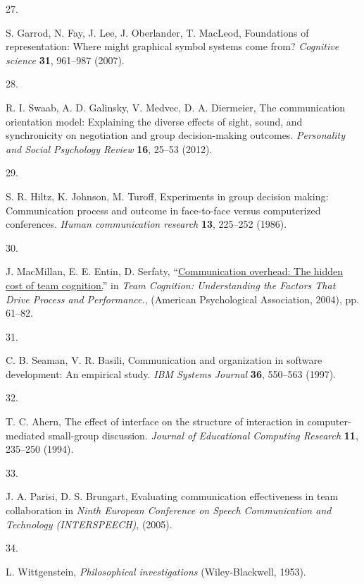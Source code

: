 \documentclass[9pt,twocolumn,twoside]{pnas-new}
\makeatletter
\newlength{\cslhangindent}
\newlength{\csllabelwidth}
\newenvironment{CSLReferences}[2] %
 {\begin{list}{}{%
  \setlength{\itemindent}{0pt}
  \setlength{\leftmargin}{0pt}
  \setlength{\parsep}{0pt}
   \normalfont\sffamily\fontsize{6}{8}\selectfont
    \labelsep2.8pt
   \renewcommand\newblock{\hskip .11em \@plus.33em \@minus.07em}
  \ifodd #1
   \setlength{\leftmargin}{\cslhangindent}
   \setlength{\itemindent}{-1\cslhangindent}
  \fi
  \setlength{\itemsep}{0.0pt}}}
 {\end{list}}
\newcommand{\CSLLeftMargin}[1]{\parbox[t]{\csllabelwidth}{#1}}
\newcommand{\CSLRightInline}[1]{\parbox[t]{\linewidth - \csllabelwidth}{#1}\break}
\makeatother
\begin{document}
\begin{CSLReferences}{0}{1}
	\CSLLeftMargin{27. }%
	\CSLRightInline{S. Garrod, N. Fay, J. Lee, J. Oberlander, T. MacLeod,
		Foundations of representation: Where might graphical symbol systems come
		from? \emph{Cognitive science} \textbf{31}, 961--987 (2007).}
	
	\CSLLeftMargin{28. }%
	\CSLRightInline{R. I. Swaab, A. D. Galinsky, V. Medvec, D. A. Diermeier,
		The communication orientation model: Explaining the diverse effects of
		sight, sound, and synchronicity on negotiation and group decision-making
		outcomes. \emph{Personality and Social Psychology Review} \textbf{16},
		25--53 (2012).}
	
	\CSLLeftMargin{29. }%
	\CSLRightInline{S. R. Hiltz, K. Johnson, M. Turoff, Experiments in group
		decision making: Communication process and outcome in face-to-face
		versus computerized conferences. \emph{Human communication research}
		\textbf{13}, 225--252 (1986).}
	
	\CSLLeftMargin{30. }%
	\CSLRightInline{J. MacMillan, E. E. Entin, D. Serfaty,
		{``\href{https://doi.org/10.1037/10690-004}{Communication overhead:
				{The} hidden cost of team cognition.}''} in \emph{Team Cognition:
			{Understanding} the Factors That Drive Process and Performance.},
		(American Psychological Association, 2004), pp. 61--82.}
	
	\CSLLeftMargin{31. }%
	\CSLRightInline{C. B. Seaman, V. R. Basili, Communication and
		organization in software development: An empirical study. \emph{IBM
			Systems Journal} \textbf{36}, 550--563 (1997).}
	
	\CSLLeftMargin{32. }%
	\CSLRightInline{T. C. Ahern, The effect of interface on the structure of
		interaction in computer-mediated small-group discussion. \emph{Journal
			of Educational Computing Research} \textbf{11}, 235--250 (1994).}
	
	\CSLLeftMargin{33. }%
	\CSLRightInline{J. A. Parisi, D. S. Brungart, Evaluating communication
		effectiveness in team collaboration in \emph{Ninth European Conference
			on Speech Communication and Technology (INTERSPEECH)}, (2005).}
	
	\CSLLeftMargin{34. }%
	\CSLRightInline{L. Wittgenstein, \emph{Philosophical investigations}
		(Wiley-Blackwell, 1953).}
	

\end{CSLReferences}
\end{document}
